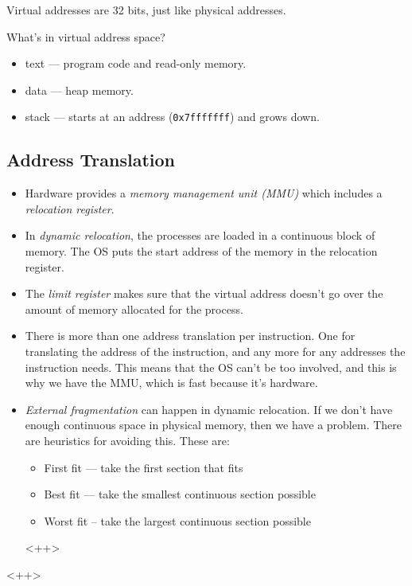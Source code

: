 \documentclass[12pt]{article}
\begin{document}
Virtual addresses are 32 bits, just like physical addresses.

What's in virtual address space?
\begin{itemize}
	\item text --- program code and read-only memory.
	\item data --- heap memory.
	\item stack --- starts at an address (\texttt{0x7fffffff}) and grows down.
\end{itemize}

\subsection{Address Translation}

\begin{itemize}
	\item Hardware provides a \emph{memory management unit (MMU)} which includes
		a \emph{relocation register}.
	\item In \emph{dynamic relocation}, the processes are loaded in a continuous
		block of memory. The OS puts the start address of the memory in the
		relocation register.
	\item The \emph{limit register} makes sure that the virtual address doesn't
		go over the amount of memory allocated for the process.
	\item There is more than one address translation per instruction. One for
		translating the address of the instruction, and any more for any
		addresses the instruction needs. This means that the OS can't be too
		involved, and this is why we have the MMU, which is fast because it's
		hardware.
	\item \emph{External fragmentation} can happen in dynamic relocation. If we
		don't have enough continuous space in physical memory, then we have a
		problem. There are heuristics for avoiding this. These are:
		\begin{itemize}
			\item First fit --- take the first section that fits
			\item Best fit --- take the smallest continuous section possible
			\item Worst fit -- take the largest continuous section possible
		\end{itemize}<++>
\end{itemize}<++>
\end{document}
